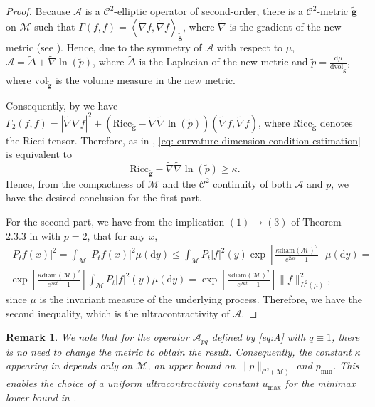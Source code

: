\documentclass[10pt,a4paper]{article}
\newcommand{\vol}{ \mathrm{vol}}
\newcommand\cA{\mathcal{A}}
\newcommand\cC{\mathcal{C}}
\newcommand\cM{\mathcal{M}}
\newcommand\dd{\mathrm{d}}
\newcommand{\SCA}[1]{{{\left\langle #1\right\rangle}}} %
\newcommand{\PAR}[1]{{{\left(#1\right)}}} %
\newcommand{\SBRA}[1]{{{\left[#1\right]}}} %
\newtheorem{remark}[theorem]{Remark}
\begin{document}
\begin{proof}
    Because $\mathcal{A}$ is a $\mathcal{C}^2$-elliptic operator of second-order, there is a $\mathcal{C}^2$-metric  $\tilde{\mathbf{g}}$ on $\mathcal{M}$ such that $\Gamma(f,f)= \SCA{\tilde{\nabla}f,\tilde{\nabla}f}_{\tilde{\mathbf{g}}}$, where $\tilde{\nabla}$ is the gradient of the new metric (see \cite[eq. 1.3.3]{Hsu2002}). 
    Hence, due to the symmetry of $\mathcal{A}$ with respect to $\mu$, $\mathcal{A} =\tilde{\Delta} + \tilde{\nabla}{ \ln(\tilde{p})}$, where $\tilde{\Delta}$ is the Laplacian of the new metric and $\tilde{p}= \frac{\dd \mu}{\dd \vol_{\tilde{\mathbf{g}}}}$, where $ \vol_{\tilde{\mathbf{g}}}$ is the volume measure in the new metric. 
    
    Consequently, by \cite[eq. C.5.3]{Bakry2014} we have $\Gamma_2(f,f)=|\tilde{\nabla} \tilde{\nabla} f |^2+\PAR{\mathrm{Ricc}_{\tilde{\mathbf{g}}} -\tilde{\nabla}\tilde{\nabla} \ln(\tilde{p})}\PAR{\tilde{\nabla} f,\tilde{\nabla} f } $, where $\mathrm{Ricc}_{\tilde{\mathbf{g}}}$ denotes the Ricci tensor. 
    Therefore, as in \cite[eq C.6.3]{Bakry2014}, \eqref{eq: curvature-dimension condition estimation} is equivalent to
    \begin{equation}\label{eq: a bound for ultracontractivity}
        \mathrm{Ricc}_{\tilde{\mathbf{g}}} - \tilde{\nabla}\tilde{\nabla} \ln(\tilde{p}) \ge \kappa.
    \end{equation}
    Hence, from the compactness of $\cM$ and the $\mathcal{C}^2$ continuity  of both $\mathcal{A}$ and $p$,  we have the desired conclusion for the first part.
    
    For the second part, we have from the implication $(1) \rightarrow (3)$ of Theorem 2.3.3 in \cite{Wang2014} with $p=2$, that for any $x$, 
    \begin{multline*}
        |P_tf(x)|^2 = \int_\cM | P_tf(x)|^2  \mu(\mathrm{d} y) \le \int_\cM  P_t |f|^2(y) \exp \SBRA{ \frac{\kappa \mathrm{diam}(\cM)^2 }{e^{2\kappa t}-1}} \mu(\mathrm{d}y)=\\
         \exp \SBRA{ \frac{\kappa \mathrm{diam}(\cM)^2 }{e^{2\kappa t}-1}} \int_\cM  P_t |f|^2(y)  \mu(\mathrm{d}y) = \exp \SBRA{ \frac{\kappa \mathrm{diam}(\cM)^2 }{e^{2\kappa t }-1}} \| f\|^2_{L^2(\mu)},
    \end{multline*}
   since $\mu$ is the invariant measure of the underlying process. Therefore, we have the second inequality, which is the ultracontractivity of $\mathcal{A}$.
\end{proof}

\begin{remark}\label{rk:u_max}
We note that for the operator $\cA_{pq}$ defined by \eqref{eq:A} with $q\equiv 1$, there is no need to change the metric to obtain the result. Consequently, the constant $\kappa$ appearing in  depends only on $\cM$, an upper bound on $\| p\|_{\cC^2(\cM)}$ and $p_{\min}$.  This enables the choice of a uniform ultracontractivity constant  $u_{\max}$  for the minimax lower bound in . 
\end{remark}
\end{document}
